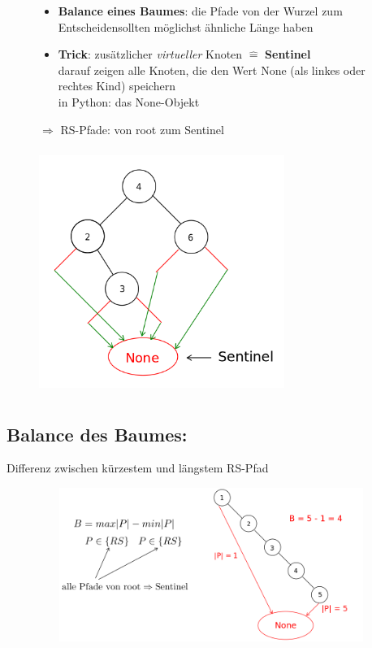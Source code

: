 \begin{figure}[htbp]
    \begin{minipage}[t]{6cm}
        \vspace{0pt}
        \begin{itemize}
            \item \textbf{Balance eines Baumes}: die Pfade von der Wurzel zum \glqq Entscheiden\grqq sollten möglichst ähnliche Länge haben
            \item \textbf{Trick}: zusätzlicher \emph{virtueller} Knoten $\widehat{=}$ \textbf{Sentinel}\\
            darauf zeigen alle Knoten, die den Wert None (als linkes oder rechtes Kind) speichern\\
            in Python: das None-Objekt
        \end{itemize}
        $\Rightarrow$ RS-Pfade: von root zum Sentinel
    \end{minipage}
    \begin{minipage}[t]{6cm}
        \vspace{-1cm}
        \centering
        \hspace*{2cm} \includegraphics[width=8cm,height=8cm,keepaspectratio]{./Pictures/Sentinel.png}
    \end{minipage}
\end{figure}

\subsection{Balance des Baumes:}
Differenz zwischen kürzestem und längstem RS-Pfad

\includegraphics[width=15cm,height=5cm,keepaspectratio]{./Pictures/Kettenbalance.png}

